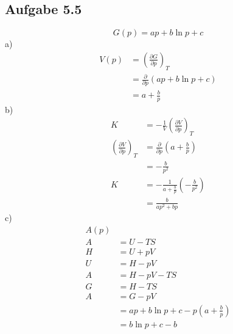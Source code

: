 \documentclass{article}
\begin{document}
\subsection*{Aufgabe 5.5}
\begin{equation*}
    G(p)=ap+b\ln p + c
\end{equation*}
a)
\begin{align*}
    V(p) &= \left(\frac{\partial G}{\partial p}\right)_T\\ &= \frac{\partial }{\partial p} (ap+b\ln p + c)\\ &= a+\frac{b}{p}
\end{align*}
b)
\begin{align*}
    K &= -\frac{1}{V}\left(\frac{\partial V}{\partial p}\right)_T\\
    \left(\frac{\partial V}{\partial p}\right)_T &= \frac{\partial}{\partial p}\left(a+\frac{b}{p}\right)\\
    &= -\frac{b}{p^2}\\
    K &= -\frac{1}{a+\frac{b}{p}}\left(-\frac{b}{p^2}\right)\\
    &= \frac{b}{ap^2 + bp}
\end{align*}
c)
\begin{align*}
    A(p)\\
    A &= U-TS\\
    H &= U+pV\\
    U &= H - pV\\
    A &= H-pV-TS\\
    G &= H-TS\\
    A &= G-pV\\
    &= ap + b\ln p + c - p (a+\frac{b}{p})\\
    &= b\ln p + c - b
\end{align*}
\end{document}
